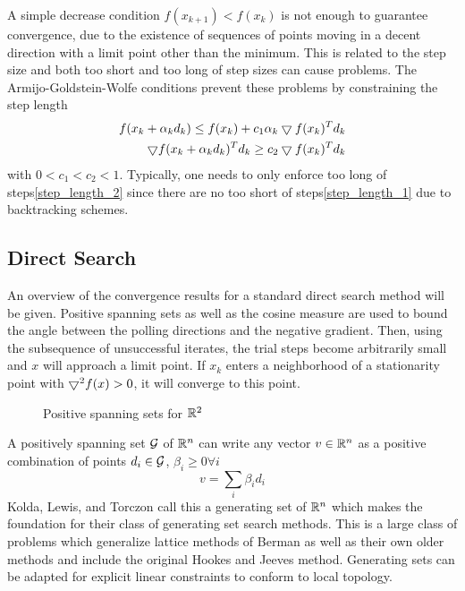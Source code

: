 A simple decrease condition $f(x_{k+1}) < f(x_{k})$ is not enough to guarantee convergence, due to the existence of sequences of points moving in a decent direction with a limit point other than the minimum.  This is related to the step size and both too short and too long of step sizes can cause problems.  The Armijo-Goldstein-Wolfe conditions prevent these problems by constraining the step length 
\begin{align}
f(x_k + \alpha_k d_k) \le f(x_k) + c_1 \alpha_k \bigtriangledown f(x_k)^T d_k  \label{step_length_1}\\
\bigtriangledown f (x_k + \alpha_k d_k)^T d_k \ge c_2 \bigtriangledown f(x_k)^T d_k \label{step_length_2}
\end{align}
with $0 < c_1 < c_2 < 1$.  Typically, one needs to only enforce too long of steps\ref{step_length_2} since there are no too short of steps\ref{step_length_1} due to backtracking schemes.


\subsection{Direct Search}
An overview of the convergence results for a standard direct search method will be given. Positive spanning sets as well as the cosine measure are used to bound the angle between the polling directions and the negative gradient.  Then, using the subsequence of unsuccessful iterates, the trial steps become arbitrarily small and $x$ will approach a limit point.  If $x_k$ enters a neighborhood of a stationarity point with $\bigtriangledown^2 f(x) > 0$, it will converge to this point.

\begin{figure}
\centering

\caption{Positive spanning sets for $\mathbb{R}^{2}$}
\end{figure}

A positively spanning set $\mathcal{G}$ of $\mathbb{R}^{n}$ can write any vector $v \in \mathbb{R}^{n}$ as a positive combination of points $d_i \in \mathcal{G}$,  $\beta_i \geq 0 \forall i$
\begin{equation}
v = \sum_i \beta_i d_i
\end{equation}
Kolda, Lewis, and Torczon \cite{kolda_2003} call this a generating set of $\mathbb{R}^{n}$ which makes the foundation for their class of generating set search methods.  This is a large class of problems which generalize lattice methods of Berman \cite{berman_1966} \cite{berman_1969} as well as their own older methods \cite{torczon_1999} \cite{lewis_2000} and include the original Hookes and Jeeves method\cite{hooke_1961}.  Generating sets can be adapted for explicit linear constraints to conform to local topology.\endnote{}

